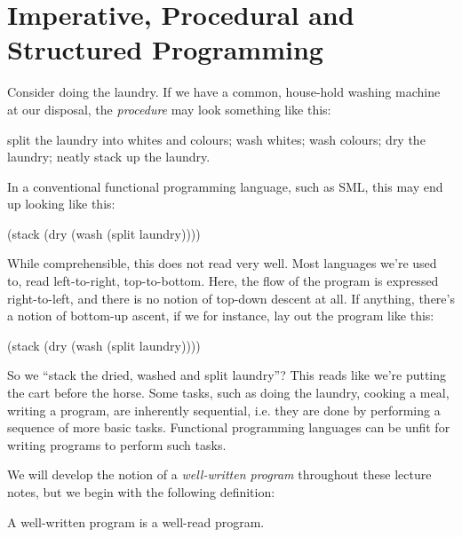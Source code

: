 \chapter{Imperative, Procedural and Structured Programming}

Consider doing the laundry. If we have a common, house-hold washing machine at
our disposal, the \emph{procedure} may look something like this:

\begin{code}
split the laundry into whites and colours;
wash whites;
wash colours;
dry the laundry;
neatly stack up the laundry.
\end{code}

In a conventional functional programming language, such as SML, this may end up
looking like this:

\begin{code}
(stack (dry (wash (split laundry))))
\end{code}

While comprehensible, this does not read very well. Most languages we're used
to, read left-to-right, top-to-bottom. Here, the flow of the program is
expressed right-to-left, and there is no notion of top-down descent at all. If
anything, there's a notion of bottom-up ascent, if we for instance, lay out the
program like this:

\begin{codebox}
\li (stack
\zi   (dry
\zi     (wash
\zi       (split laundry))))
\end{codebox}

So we ``stack the dried, washed and split laundry''? This reads like we're
putting the cart before the horse. Some tasks, such as doing the laundry,
cooking a meal, writing a program, are inherently sequential, i.e. they are
done by performing a sequence of more basic tasks.  Functional programming
languages can be  unfit for
writing programs to perform such tasks.

We will develop the notion of a \emph{well-written program} throughout these
lecture notes, but we begin with the following definition:

\begin{definition}

A well-written program is a well-read program.

\end{definition}

